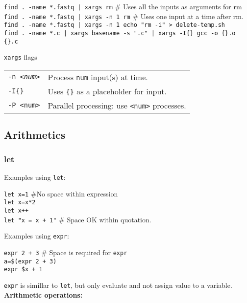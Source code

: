 \begin{mdframed}
\texttt{find . -name *.fastq | xargs rm} \# Uses all the inputs as arguments for rm\\
\texttt{find . -name *.fastq | xargs -n 1 rm} \# Uses one input at a time after rm.\\
\texttt{find . -name *.fastq | xargs -n 1 echo "rm -i" > delete-temp.sh}\\
\texttt{find . -name *.c | xargs basename -s ".c" | xargs -I\{\} gcc -o \{\}.o \{\}.c }
\end{mdframed}
\texttt{xargs} flags
\begin{tabularx}{\linewidth}{lX}
\texttt{-n <\textit{num}>} & Process \texttt{num} input(s) at time.\\
\texttt{-I\{\}} & Uses \texttt{\{\}} as a placeholder for input.\\
\texttt{-P <num>} & Parallel processing: use \texttt{<num>} processes.\\

\end{tabularx}


\subsection{Arithmetics}
\subsubsection{let}
Examples using \texttt{let}:\\

\begin{mdframed}
\texttt{let x=1} \#No space within expression\\
\texttt{let x=x*2}\\
\texttt{let x++}\\
\texttt{let "x = x + 1"} \# Space OK within quotation.
\end{mdframed}

Examples using \texttt{expr}:
\begin{mdframed}
\texttt{expr 2 + 3} \# Space is required for \texttt{expr}\\
\texttt{a=\$(expr 2 + 3)}\\
\texttt{expr \$x + 1}
\end{mdframed}

\texttt{expr} is simillar to \texttt{let}, but only evaluate and not assign value to a variable.\\

\textbf{Arithmetic operations:}

